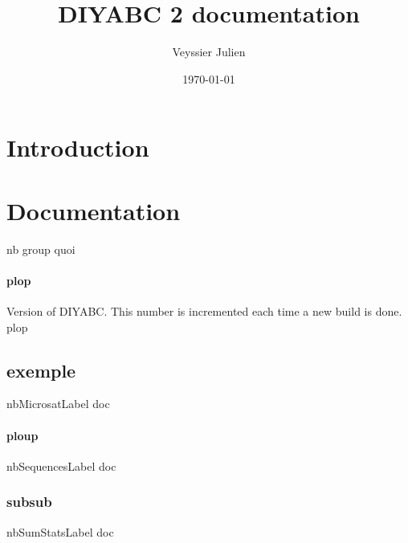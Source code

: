 \documentclass[12pt,a4paper]{article}
\author{Veyssier Julien}
\title{DIYABC 2 documentation}
\date\today
\begin{document}
\maketitle
\newpage

\tableofcontents

\newpage
 

\section{Introduction}

\section{Documentation}
        \label{doc_nbGroupLabel}
        nb group quoi

        \paragraph{plop}
        \label{doc_versionLabel}
        Version of DIYABC. This number is incremented each time a new build is done.
        plop

        \subsection{exemple}
        \label{doc_nbMicrosatLabel}
        nbMicrosatLabel doc
            \paragraph{ploup}
            \label{doc_nbSequencesLabel}
            nbSequencesLabel doc

            \subsubsection{subsub}
            \label{doc_nbSumStatsLabel}
            nbSumStatsLabel doc
\end{document}

